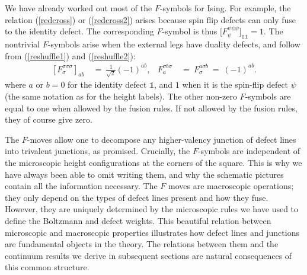 \documentclass[11pt]{article}
\numberwithin{equation}{section}		%
\begin{document}
We have already worked out most of the $F$-symbols for Ising. For example, the relation (\ref{redcross}) or (\ref{redcross2}) arises because spin flip defects can only fuse to the identity defect.
The corresponding $F$-symbol is thus $\Big[F_\psi^{\psi \psi \psi} \Big]_{\mathds{1} \mathds{1}}=1$.
The nontrivial $F$-symbols arise when the external legs have duality defects, and follow from (\ref{reshuffle1}) and (\ref{reshuffle2}):
\begin{align}
	\left[F_{\sigma}^{\sigma \sigma \sigma} \right]_{ab} \ &=\  \frac{1}{\sqrt2}(-1)^{ab},
	& F_{a}^{ \sigma b \sigma } \ &=\  F_{ \sigma }^{a \sigma b} \ =\   (-1)^{ab}.
\label{FSymbol}
\end{align}
where $a$ or $b=0$ for the identity defect $\mathds{1}$, and $1$ when it is the spin-flip defect $\psi$ (the same notation as for the height labels). 
The other non-zero $F$-symbols are equal to one when allowed by the fusion rules. If not allowed by the fusion rules, they of course give zero.

The $F$-moves allow one to decompose any higher-valency junction of defect lines into trivalent junctions, as promised. 
Crucially, the $F$-symbols are independent of the microscopic height configurations at the corners of the square. This is why we have always been able to omit writing them, and why the schematic pictures contain all the information necessary. The $F$ moves are macroscopic operations; they only depend on the types of defect lines present and how they fuse. However, they are uniquely determined by the microscopic rules we have used to define the Boltzmann and defect weights. 
This beautiful relation between microscopic and macroscopic properties illustrates how defect lines and junctions are fundamental objects in the theory. The relations between them and the continuum results we derive in subsequent sections are natural consequences of this common structure. 

\end{document}
